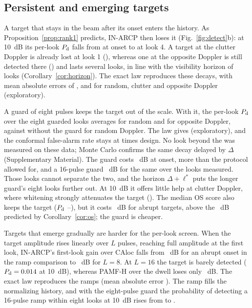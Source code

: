 \documentclass[journal]{IEEEtran}
\begin{document}
\subsection{Persistent and emerging targets}\label{sec:onset}
A target that stays in the beam after its onset enters the history. As Proposition~\ref{prop:rank1} predicts, IN-ARCP then loses it (Fig.~\ref{fig:detect}b): at 10~dB its per-look $P_{\rm d}$ falls from \OnLookZero{} at onset to \OnLookFour{} at look 4. A target at the clutter Doppler is already lost at look 1 (\OnMatchedOne), whereas one at the opposite Doppler is still detected there (\OnOppOne) and lasts several looks, in line with the visibility horizon of \ThHorizonOpp{} looks (Corollary~\ref{cor:horizon}). The exact law reproduces these decays, with mean absolute errors of \OnTheoryMaeRand, \OnTheoryMaeMatch{} and \OnTheoryMaeOpp{} for random, clutter and opposite Doppler (exploratory).

A guard of eight pulses keeps the target out of the scale. With it, the per-look $P_{\rm d}$ over the eight guarded looks averages \GuardMeanLookEight{} for random and \GuardOppEight{} for opposite Doppler, against \GuardMeanLookZero{} without the guard for random Doppler. The law gives \GuardLawEight{} (exploratory), and the conformal false-alarm rate stays at \GuardPfaEight{} times design. No look beyond the \GuardLooksMeasuredOrd{} was measured on these data; Monte Carlo confirms the same decay delayed by $\Delta$ (Supplementary Material). The guard costs \GuardOnsetCost~dB at onset, more than the protocol allowed for, and a 16-pulse guard \GuardOnsetCostSixteen~dB for the same \GuardMeanLookSixteen{} over the looks measured. Those looks cannot separate the two, and the horizon $\Delta+\ell^*$ puts the longer guard's eight looks further out. At 10~dB it offers little help at clutter Doppler, where whitening strongly attenuates the target (\GuardMatchedEight). The median OS score also keeps the target ($P_{\rm d}$ \OsPersFirst--\OsPersLast), but it costs \OsCostEight~dB for abrupt targets, above the \OSLossEight~dB predicted by Corollary~\ref{cor:os}; the guard is cheaper.

Targets that emerge gradually are harder for the per-look screen. When the target amplitude rises linearly over $L$ pulses, reaching full amplitude at the first look, IN-ARCP's first-look gain over CAloc falls from \RampGainOne~dB for an abrupt onset in the ramp comparison to \RampGainEight~dB for $L=8$. At $L=16$ the target is barely detected ($P_{\rm d}=0.014$ at 10~dB), whereas PAMF-H over the dwell loses only \RampPAMFLoss~dB. The exact law reproduces the ramps (mean absolute error \RampMae). The ramp fills the normalizing history, and with the eight-pulse guard the probability of detecting a 16-pulse ramp within eight looks at 10~dB rises from \GuardRampZero{} to \GuardRampEight.
\end{document}
